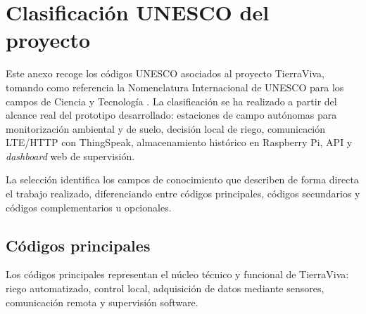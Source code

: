 \chapter{Clasificación UNESCO del proyecto}
\label{anexo:codigos_unesco}

Este anexo recoge los códigos UNESCO asociados al proyecto TierraViva, tomando como referencia la Nomenclatura Internacional de UNESCO para los campos de Ciencia y Tecnología \cite{unesco_nomenclatura_cyt}. La clasificación se ha realizado a partir del alcance real del prototipo desarrollado: estaciones de campo autónomas para monitorización ambiental y de suelo, decisión local de riego, comunicación LTE/HTTP con ThingSpeak, almacenamiento histórico en Raspberry Pi, API y \textit{dashboard} web de supervisión.

La selección identifica los campos de conocimiento que describen de forma directa el trabajo realizado, diferenciando entre códigos principales, códigos secundarios y códigos complementarios u opcionales.

\section{Códigos principales}

Los códigos principales representan el núcleo técnico y funcional de TierraViva: riego automatizado, control local, adquisición de datos mediante sensores, comunicación remota y supervisión software.

\begingroup
\small
\renewcommand{\arraystretch}{1.18}


